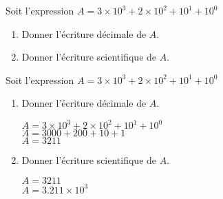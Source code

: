 \begin{exercice*}
    Soit l'expression $A=3\times 10^3 + 2\times 10^2 + 10^1 + 10^0$
    \begin{enumerate}    
        \item Donner l'écriture décimale de $A$.
        \item Donner l'écriture scientifique de $A$.
    \end{enumerate}    
\end{exercice*}
\begin{corrige}
    Soit l'expression $A=3\times 10^3 + 2\times 10^2 + 10^1 + 10^0$
    \begin{enumerate}    
        \item Donner l'écriture décimale de $A$.
        
        {\red 
            $A=3\times 10^3 + 2\times 10^2 + 10^1 + 10^0$\\
            $A=\num{3000} + 200 + 10 + 1$\\
            $A=\num{3211}$
        }
        \item Donner l'écriture scientifique de $A$.
        
        {\red 
            $A=\num{3211}$\\
            $A=\num{3.211}\times 10^3$
        }
    \end{enumerate}    
\end{corrige}


